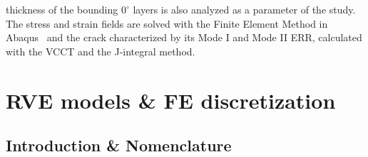 \documentclass[review]{elsarticle}
\begin{document}
thickness of the bounding $0^{\circ}$ layers is also analyzed as a parameter of the study. The stress and strain fields are solved with the Finite Element Method in Abaqus~\cite{abq12} and the crack characterized by its Mode I and Mode II ERR, calculated with the VCCT and the J-integral method.


\section{RVE models \& FE discretization}


\subsection{Introduction \& Nomenclature}\label{subsec:names}
\end{document}
